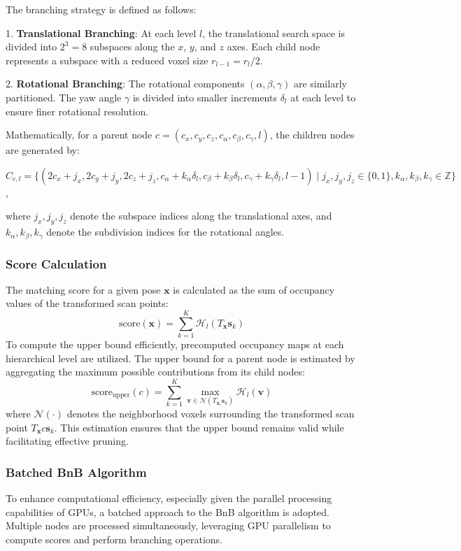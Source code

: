 The branching strategy is defined as follows:

1. \textbf{Translational Branching}: At each level $l$, the translational search space is divided into $2^3 = 8$ subspaces along the $x$, $y$, and $z$ axes. Each child node represents a subspace with a reduced voxel size $r_{l-1} = r_l / 2$.

2. \textbf{Rotational Branching}: The rotational components $(\alpha, \beta, \gamma)$ are similarly partitioned. The yaw angle $\gamma$ is divided into smaller increments $\delta_l$ at each level to ensure finer rotational resolution.

Mathematically, for a parent node $c = (c_x, c_y, c_z, c_\alpha, c_\beta, c_\gamma, l)$, the children nodes are generated by:

$C_{c,l} = \{(2c_x + j_x, 2c_y + j_y, 2c_z + j_z, c_\alpha + k_\alpha \delta_l, c_\beta + k_\beta \delta_l, c_\gamma + k_\gamma \delta_l, l-1) \mid j_x, j_y, j_z \in \{0,1\}, k_\alpha, k_\beta, k_\gamma \in \mathbb{Z}\}$,

where $j_x, j_y, j_z$ denote the subspace indices along the translational axes, and $k_\alpha, k_\beta, k_\gamma$ denote the subdivision indices for the rotational angles.

\subsubsection{Score Calculation}
The matching score for a given pose $\mathbf{x}$ is calculated as the sum of occupancy values of the transformed scan points:
$$\text{score}(\mathbf{x}) = \sum_{k=1}^{K} \mathcal{H}_l(T_{\mathbf{x}}\mathbf{s}_k)$$
To compute the upper bound efficiently, precomputed occupancy maps at each hierarchical level are utilized. The upper bound for a parent node is estimated by aggregating the maximum possible contributions from its child nodes:
$$\text{score}_{\text{upper}}(c) = \sum_{k=1}^{K} \max_{\mathbf{v} \in \mathcal{N}(T_{\mathbf{x}_c} \mathbf{s}_k)} \mathcal{H}_l(\mathbf{v})$$
where $\mathcal{N}(\cdot)$ denotes the neighborhood voxels surrounding the transformed scan point $T_{\mathbf{x}}c \mathbf{s}_k$. This estimation ensures that the upper bound remains valid while facilitating effective pruning.

\subsubsection{Batched BnB Algorithm}
To enhance computational efficiency, especially given the parallel processing capabilities of GPUs, a batched approach to the BnB algorithm is adopted. Multiple nodes are processed simultaneously, leveraging GPU parallelism to compute scores and perform branching operations.

